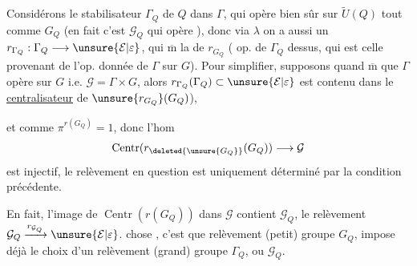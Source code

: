 Considérons le stabilisateur $\Gamma_Q$ de $Q$ dans $\Gamma$,  qui opère bien sûr sur $\widetilde U(Q)$ tout comme $G_Q$ (en fait c'est $\mathcal G_Q$ qui opère  \unsure{\dots}), donc via $\lambda$ on a aussi un  $r_{\Gamma_Q}:\Gamma_Q\longrightarrow\unsure{\mathcal E|\varepsilon}$, qui  $\overline{\mathrm m}$ la  de  $r_{G_Q}$ ( op. de  $\Gamma_Q$ dessus, qui est celle provenant de l'op. donnée de $\Gamma$ sur $G$).
Pour simplifier, supposons quand $\overline{\mathrm m}$ que $\Gamma$ opère  sur $G$ i.e. $\mathcal G=\Gamma\times G$, alors $r_{\Gamma_Q}(\Gamma_Q)\subset\unsure{\mathcal E|\varepsilon}$ est contenu dans le \uline{centralisateur} de  $\unsure{r_{G_Q}}(G_Q)$),


et comme $\pi^{r(G_Q)}=1$, donc l'hom
\[
\operatorname{Centr}(r_{\deleted{\unsure{G_Q}}}(G_Q))\longrightarrow\mathcal G
\]
est injectif, le relèvement en question  est uniquement déterminé par la condition précédente.

En fait, l'image de $\operatorname{Centr}(r(G_Q))$ dans $\mathcal G$ contient $\mathcal G_Q$,    le relèvement $\mathcal G_Q\xrightarrow{r_{\mathcal G_Q}}\unsure{\mathcal E|\varepsilon}$.
 chose , c'est que   relèvement  (petit) groupe $G_Q$, impose déjà le choix d'un relèvement  (grand) groupe $\Gamma_Q$, ou $\mathcal G_Q$.

